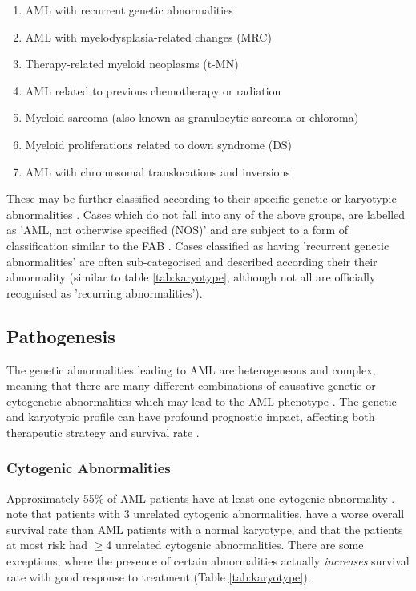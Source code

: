 \begin{enumerate}
\item AML with recurrent genetic abnormalities
\item AML with myelodysplasia-related changes (MRC)
\item Therapy-related myeloid neoplasms (t-MN)
\item AML related to previous chemotherapy or radiation
\item Myeloid sarcoma (also known as granulocytic sarcoma or chloroma)
\item Myeloid proliferations related to down syndrome (DS)
\item AML with chromosomal translocations and inversions
\end{enumerate}

These may be further classified according to their specific genetic or karyotypic abnormalities \citep{whoclassification}. Cases which do not fall into any of the above groups, are labelled as 'AML, not otherwise specified (NOS)' and are subject to a form of classification similar to the \ac{FAB} \citep{ACS2018}. Cases classified as having 'recurrent genetic abnormalities' are often sub-categorised and described according their their abnormality (similar to table \ref{tab:karyotype}, although not all are officially recognised as 'recurring abnormalities').


\subsection{Pathogenesis}
\label{Pathogenesis}
The genetic abnormalities leading to \ac{AML} are heterogeneous and complex, meaning that there are many different combinations of causative genetic or cytogenetic abnormalities which may lead to the \ac{AML} phenotype \citep{lindsley2015acute, whoclassification}. The genetic and karyotypic profile can have profound prognostic impact, affecting both therapeutic strategy and survival rate \citep{mrozek2000prognostic, whoclassification}. 

\subsubsection{Cytogenic Abnormalities}
Approximately 55\% of \ac{AML} patients have at least one cytogenic abnormality \citep{meyer2014translational}.  \cite{stolzel2016karyotype} note that patients with 3 unrelated cytogenic abnormalities, have a worse overall survival rate than \ac{AML} patients with a normal karyotype, and that the patients at most risk had $ \geq $4 unrelated cytogenic abnormalities. There are some exceptions, where the presence of certain abnormalities actually \textit{increases} survival rate with good response to treatment (Table \ref{tab:karyotype}). 

